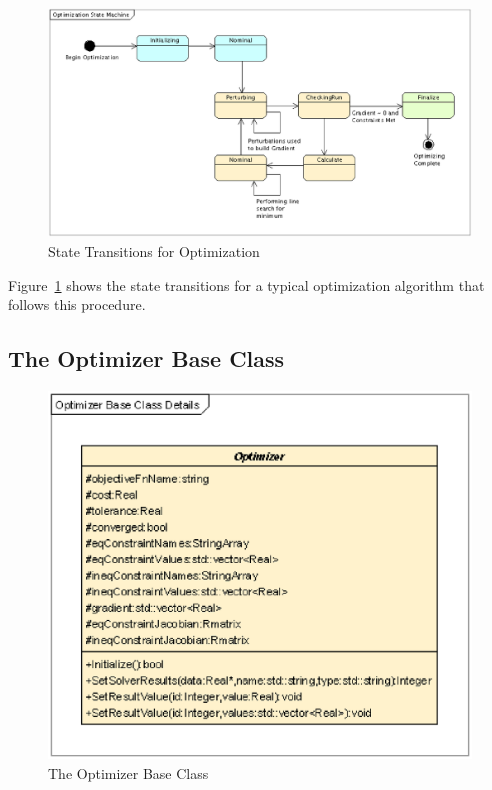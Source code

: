 \begin{figure}[htb]
\begin{center}
\includegraphics[scale=0.5]{Images/OptimizationStateMachine.eps}
\caption{\label{figure:OptimizationStateMachine}State Transitions for Optimization}
\end{center}
\end{figure}

\noindent Figure~\ref{figure:OptimizationStateMachine} shows the state transitions for a typical
optimization
algorithm that follows this procedure.

\subsection{The Optimizer Base Class}

\begin{figure}[htb]
\begin{center}
\includegraphics[scale=0.5]{Images/OptimizerBaseClassDetails.eps}
\caption{\label{figure:OptimizerBaseClass}The Optimizer Base Class}
\end{center}
\end{figure}

